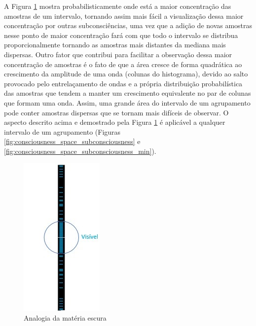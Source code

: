 A Figura \ref{fig:consciousness_dark_matter_dark_energy_wave} mostra probabilisticamente onde está a maior concentração das amostras de um intervalo, tornando assim mais fácil a visualização dessa maior concentração por outras subconsciências, uma vez que a adição de novas amostras nesse ponto de maior concentração fará com que todo o intervalo se distribua proporcionalmente tornando as amostras mais distantes da mediana mais dispersas. Outro fator que contribui para facilitar a observação dessa maior concentração de amostras é o fato de que a área cresce de forma quadrática ao crescimento da amplitude de uma onda (colunas do histograma), devido ao salto provocado pelo entrelaçamento de ondas e a própria distribuição probabilística das amostras que tendem a manter um crescimento equivalente no par de colunas que formam uma onda. Assim, uma grande área do intervalo de um agrupamento pode conter amostras dispersas que se tornam mais difíceis de observar. O aspecto descrito acima e demostrado pela Figura \ref{fig:consciousness_dark_matter_dark_energy_wave} é aplicável a qualquer intervalo de um agrupamento (Figuras \ref{fig:consciousness_space_subconsciousness} e \ref{fig:consciousness_space_subconsciousness_min}).
	\begin{figure}[H]
	\caption{Analogia da matéria escura}
	\label{fig:consciousness_dark_matter_dark_energy_wave}
	\centering
	\includegraphics[scale=.85]{sections/images/consciousness_dark_matter_dark_energy_wave.jpg}
	\end{figure}

